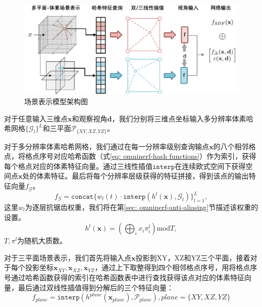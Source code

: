 \begin{figure}[ht]
    \centering
    \includegraphics[width=\textwidth]{undergraduate-thesis/images/omninerf-scene-representation.pdf}
    \caption{场景表示模型架构图}
    \label{fig:omninerf-scene-representation}
\end{figure}

对于任意输入三维点$\mathbf{x}$和观察视角$\mathbf{d}$，我们分别将三维点坐标输入多分辨率体素哈希网格$\{\mathcal{G}_l\}^L$和三平面$\mathcal{P}_{\{XY,XZ,YZ\}}$。

对于多分辨率体素哈希网格，我们通过在每一分辨率级别查询输点$\mathbf{x}$的八个相邻格点，将格点序号对应哈希函数（式\ref{eq: omninerf-hash functions}）作为索引，获得每个格点对应的体素特征向量。通过三线性插值$\mathtt{interp}$在连续欧式空间下获得空间点$\mathbf{x}$处的体素特征。最后将每个分辨率层级获得的特征拼接，得到该点的输出特征向量$f_{\mathcal{G}}$。
\begin{equation}
    f_{\mathcal{G}} = \mathtt{concat}\{w_l(t)\cdot\mathtt{interp}(h^l(\mathbf{x}), \mathcal{G}_l)\}_{l=1}^L,
\end{equation}
这里$w_l$为逐层抗锯齿权重，我们将在第\ref{sec: omninerf-anti-aliasing}节描述该权重的设置。
\begin{equation}
    h^l(\mathbf{x}) = \left(\bigoplus_{i}x_i\pi_i^l\right) \text{mod} T,
    \label{eq: omninerf-hash functions}
\end{equation}
$T, \pi^l$为随机大质数。

对于三平面场景表示，我们首先将输入点$\mathbf{x}$投影到XY，XZ和YZ三个平面，接着对于每个投影坐标$\mathbf{x}_{XY},\mathbf{x}_{XZ},\mathbf{x}_{YZ}$，通过上下取整得到四个相邻格点序号，用将格点序号通过哈希函数获得的索引在哈希函数表中进行查找获得该点对应的体素特征向量，最后通过双线性插值得到分解后的三个特征向量：
\begin{equation}
    f_{plane} = \mathtt{interp}(h^{plane}(\mathbf{x}_{plane}), \mathcal{P}_{plane})
    ,plane=\{XY,XZ,YZ\}
\end{equation}

